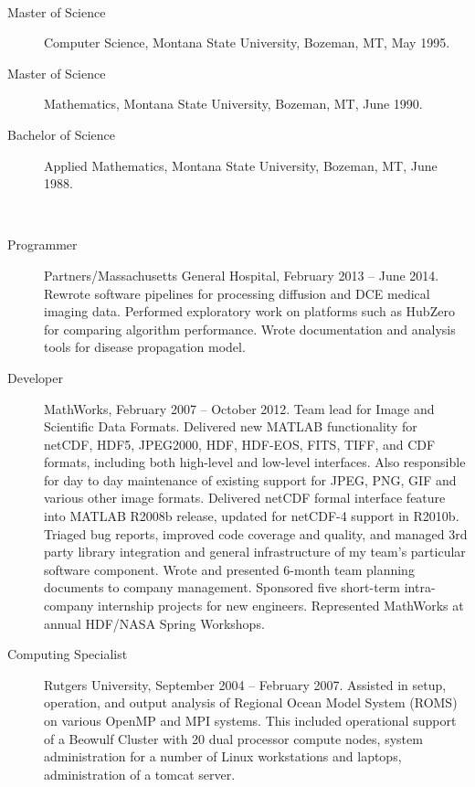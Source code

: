 \documentclass[11pt]{article}  %
\begin{document}
\bigskip 
{}\\ 
\begin{description}
  \item[Master of Science] Computer Science, Montana State University, Bozeman,
    MT, May 1995.
  \item[Master of Science] Mathematics, Montana State University, Bozeman,
    MT, June 1990.
  \item[Bachelor of Science] Applied Mathematics, Montana State University,
    Bozeman, MT, June 1988.
\end{description}

\bigskip 
{}\\ 
\begin{description}
  \item[Programmer] Partners/Massachusetts General Hospital, February 2013 --
    June 2014.  Rewrote software pipelines for processing diffusion and
    DCE medical imaging data.  Performed exploratory work on platforms
    such as HubZero  for comparing algorithm performance. Wrote
    documentation and analysis tools for disease propagation model.
  \item[Developer] MathWorks, February 2007 -- October 2012.  Team lead for
    Image and Scientific Data Formats.  Delivered new MATLAB functionality
    for netCDF, HDF5, JPEG2000, HDF, HDF-EOS, FITS, TIFF, and CDF formats,
    including both high-level and low-level interfaces.  Also responsible
    for day to day maintenance of existing support for JPEG, PNG, GIF
    and various other image formats.  Delivered netCDF formal interface
    feature into MATLAB R2008b release, updated for netCDF-4 support
    in R2010b. Triaged bug reports, improved code coverage and quality,
    and managed 3rd party library integration and general infrastructure
    of my team's particular software component.  Wrote and presented
    6-month team planning documents to company management.  Sponsored
    five short-term intra-company internship projects for new engineers.
    Represented MathWorks at annual HDF/NASA Spring Workshops.
  \item[Computing Specialist] Rutgers University, September 2004 --
    February 2007. Assisted in setup,  operation, and output analysis  of
    Regional Ocean Model System (ROMS) on various OpenMP and MPI systems.
    This included operational support of a Beowulf Cluster with 20 dual
    processor compute nodes, system administration for a number of Linux
    workstations and laptops, administration of a tomcat server.

\end{description}
\end{document}
